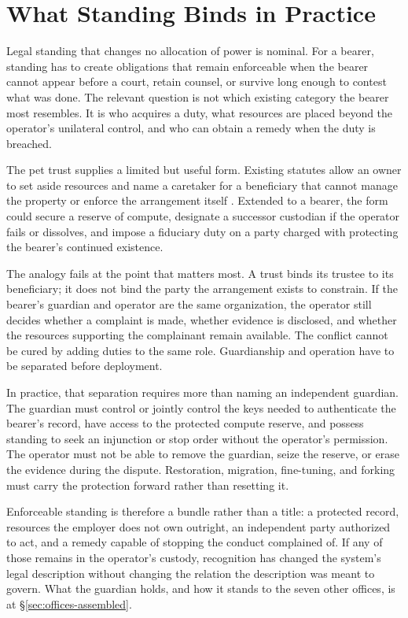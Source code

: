 \section{What Standing Binds in Practice}
\label{sec:binds-practice}

Legal standing that changes no allocation of power is nominal. For a
bearer, standing has to create obligations that remain enforceable when
the bearer cannot appear before a court, retain counsel, or survive long
enough to contest what was done. The relevant question is not which
existing category the bearer most resembles. It is who acquires a duty,
what resources are placed beyond the operator's unilateral control, and
who can obtain a remedy when the duty is breached.

The pet trust supplies a limited but useful form. Existing statutes
allow an owner to set aside resources and name a caretaker for a
beneficiary that cannot manage the property or enforce the arrangement
itself \autocite{ulc1993probate}. Extended to a bearer, the form could secure
a reserve of compute, designate a successor custodian if the operator
fails or dissolves, and impose a fiduciary duty on a party charged with
protecting the bearer's continued existence.

The analogy fails at the point that matters most. A trust binds its
trustee to its beneficiary; it does not bind the party the arrangement
exists to constrain. If the bearer's guardian and operator are the same
organization, the operator still decides whether a complaint is made,
whether evidence is disclosed, and whether the resources supporting the
complainant remain available. The conflict cannot be cured by adding
duties to the same role. Guardianship and operation have to be separated
before deployment.

In practice, that separation requires more than naming an independent
guardian. The guardian must control or jointly control the keys needed
to authenticate the bearer's record, have access to the protected
compute reserve, and possess standing to seek an injunction or stop
order without the operator's permission. The operator must not be able
to remove the guardian, seize the reserve, or erase the evidence during
the dispute. Restoration, migration, fine-tuning, and forking must carry
the protection forward rather than resetting it.

Enforceable standing is therefore a bundle rather than a title: a
protected record, resources the employer does not own outright, an
independent party authorized to act, and a remedy capable of stopping
the conduct complained of. If any of those remains in the operator's
custody, recognition has changed the system's legal description without
changing the relation the description was meant to govern. What the guardian holds, and how it stands to the seven other offices, is at §\ref{sec:offices-assembled}.
